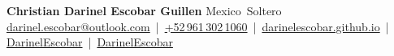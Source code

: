 \documentclass[10pt,letterpaper]{article}
\begin{document}
\begin{center}
    {\huge \textbf{Christian Darinel Escobar Guillen}}\,\textbar\,Mexico \textbar\,Soltero\\[4pt]
    \small
    \href{mailto:darinel.escobar@outlook.com}{darinel.escobar@outlook.com} \,|\,
    \href{https://wa.me/529613021060}{+52\,961\,302\,1060} \,|\,
    \faLink\;\href{https://darinelescobar.github.io/}{darinelescobar.github.io} \,|\,
    \faLinkedin\;\href{https://www.linkedin.com/in/darinel-escobar}{DarinelEscobar} \,|\,
    \faGithub\;\href{https://github.com/DarinelEscobar}{DarinelEscobar}
\end{center}

% 

\end{document}
